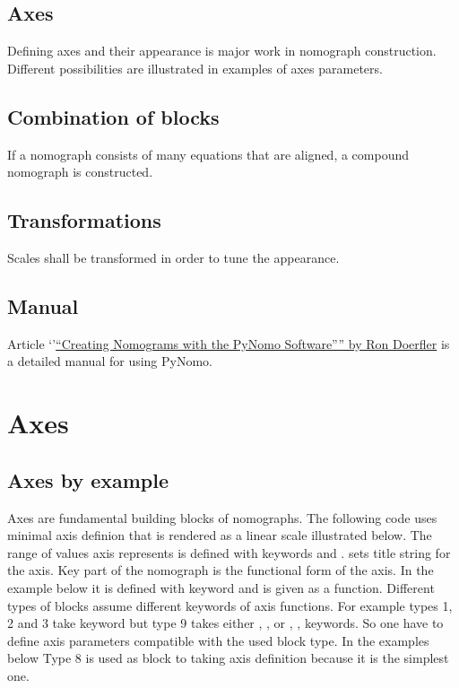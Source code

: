 \documentclass[a4paper,11pt,english]{sphinxmanual}
\begin{document}
\section{Axes}
\label{main_page:axes}
Defining axes and their appearance is major work in nomograph
construction. Different possibilities are illustrated in examples of
axes parameters.


\section{Combination of blocks}
\label{main_page:combination-of-blocks}
If a nomograph consists of many equations that are aligned, a compound
nomograph is constructed.


\section{Transformations}
\label{main_page:transformations}
Scales shall be transformed in order to tune the
appearance.


\section{Manual}
\label{main_page:manual}
Article `'\href{http://www.myreckonings.com/pynomo/CreatingNomogramsWithPynomo.pdf}{``Creating Nomograms with the PyNomo Software'''' by Ron
Doerfler} is a detailed
manual for using PyNomo.


\chapter{Axes}
\label{axes/axes:axes}\label{axes/axes::doc}

\section{Axes by example}
\label{axes/axes:axes-by-example}
Axes are fundamental building blocks of nomographs. The following code uses minimal axis definion  that is
rendered as a linear scale illustrated below. The range of values axis represents is defined with keywords 
and .  sets title string for the axis. Key part of the nomograph is the functional form of the axis.
In the example below it is defined with keyword  and is given as a function. Different types of blocks assume different keywords
of axis functions. For example types 1, 2 and 3 take keyword  but type 9 takes either , ,  or
, ,  keywords. So one have to define axis parameters compatible with the used block type.
In the examples below Type 8 is used as block to taking axis definition because it is the simplest one.
\end{document}

